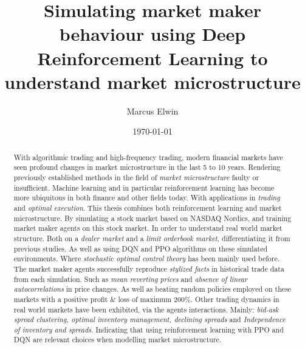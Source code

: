 \documentclass{kththesis}
\title{Simulating market maker behaviour using Deep Reinforcement Learning to understand market microstructure}
\author{Marcus Elwin}
\date{\today}
\theoremstyle{definition}
\begin{document}


%

\frontmatter

\titlepage

\begin{abstract}
With algorithmic trading and high-frequency trading,  modern financial markets have seen profound changes in market microstructure in the last 5 to 10 years. Rendering previously established methods in the field of \textit{market microstructure} faulty or insufficient. Machine learning and in particular reinforcement learning has become more ubiquitous in both finance and other fields today. With applications in \textit{trading} and \textit{optimal execution}. This thesis combines both reinforcement learning and market microstructure. By simulating a stock market based on NASDAQ Nordics, and training market maker agents on this stock market. In order to understand real world market structure. 
\newline
\newline
Both on a \textit{dealer market} and a \textit{limit orderbook market}, differentiating it from previous studies. As well as using DQN and PPO algorithms on these simulated environments. Where \textit{stochastic optimal control theory} has been mainly used before. The market maker agents successfully reproduce \textit{stylized facts} in historical trade data from each simulation. Such as \textit{mean reverting prices} and \textit{absence of linear autocorrelations} in price changes. As well as beating random policies employed on these markets with a positive profit \& loss of maximum $200\%$. Other trading dynamics in real world markets have been exhibited, via the agents interactions. Mainly: \textit{bid-ask spread clustering, optimal inventory management, declining spreads} and \textit{Independence of inventory and spreads}. Indicating that using reinforcement learning with PPO and DQN are relevant choices when modelling market microstructure.

\end{abstract}
\end{document}
